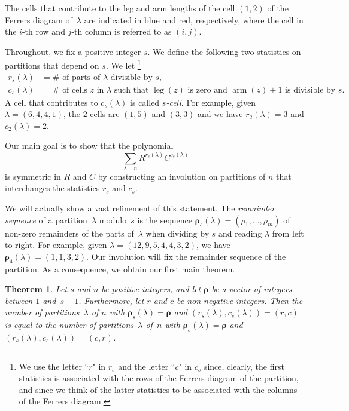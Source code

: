 \documentclass[12pt,reqno]{amsart}
\numberwithin{equation}{section}
\newtheorem{theorem}{Theorem}
\theoremstyle{definition}
\newcommand{\Dfn}[1]{\emph{\color{blue}#1}} %
\DeclareMathOperator{\leg}{leg}
\DeclareMathOperator{\arm}{arm}
\newcommand{\rem}{{\boldsymbol\rho}}
\begin{document}
The cells that contribute to the leg and arm lengths of the cell $(1,2)$ of the Ferrers diagram
of~$\lambda$ are indicated in blue and red, respectively, where the cell in the $i$-th row and $j$-th column is referred to as $(i,j)$.


\medskip

Throughout, we fix a positive integer $s$.  We define the following two statistics on partitions that depend on $s$. We let%
\footnote{We use the letter ``$r$" in $r_s$ and the letter ``$c$" in $c_s$
since, clearly, the first statistics is associated with the rows of the
Ferrers diagram of the partition, and since we think of the latter statistics
to be associated with the columns of the Ferrers diagram.}
\begin{align*}
r_s(\lambda) &= \# \text{ of parts of $\lambda$ divisible by $s$}, \\
c_s(\lambda) &= \# \text{ of cells $z$ in $\lambda$ such that $\leg(z)$ is zero and $\arm(z)+1$ is divisible by $s$.}
\end{align*}
A cell that contributes to $c_s(\lambda)$
is called \Dfn{$s$-cell}.  For example, given $\lambda=(6,4,4,1)$, the $2$-cells are $(1,5)$ and $(3,3)$ and we have
$r_2(\lambda)=3$ and $c_2(\lambda)=2$.

Our main goal is to show that the polynomial
$$\sum_{\lambda \vdash n} R^{r_s(\lambda)} C^{c_s(\lambda)}$$
is symmetric in $R$ and $C$ by constructing an involution on partitions
of $n$ that interchanges the statistics $r_s$ and $c_s$.

We will actually show a {vast} refinement of this statement.
The \Dfn{remainder sequence} of a partition~$\lambda$ modulo~$s$ is the sequence $\rem_s(\lambda)=(\rho_1,\dots, \rho_m)$ of non-zero remainders of the parts of~$\lambda$ when dividing by $s$ and reading $\lambda$ from left to right.
For example, given $\lambda=(12,9,5,4,4,3,2)$, we have $\rem_4(\lambda)=(1,1,3,2)$.  Our involution will fix the remainder sequence of the partition.
As a consequence, we obtain our first main theorem.

\begin{theorem}
\label{main}
Let $s$ and $n$ be positive integers, and let $\rem$ be a vector of integers between $1$ and~$s-1$. Furthermore, let $r$ and $c$ {be} non-negative integers. Then the number of partitions~$\lambda$ of $n$ with $\rem_s(\lambda)=\rem$ and
$(r_s(\lambda),c_s(\lambda))=(r,c)$ is equal to the number of partitions~$\lambda$ of~$n$ with $\rem_s(\lambda)=\rem$ and $(r_s(\lambda),c_s(\lambda))=(c,r)$.
\end{theorem}
\end{document}

